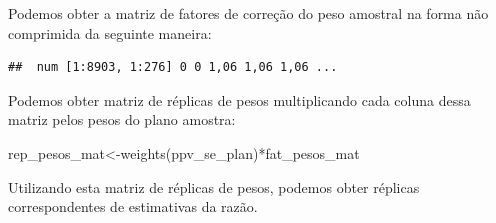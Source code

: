 \documentclass[
  12pt,
  brazilian,
]{book}
\newenvironment{Shaded}{\begin{snugshade}}{\end{snugshade}}
\newcommand{\ControlFlowTok}[1]{\textcolor[rgb]{0.13,0.29,0.53}{\textbf{#1}}}
\newcommand{\DecValTok}[1]{\textcolor[rgb]{0.00,0.00,0.81}{#1}}
\newcommand{\FunctionTok}[1]{\textcolor[rgb]{0.00,0.00,0.00}{#1}}
\newcommand{\NormalTok}[1]{#1}
\newcommand{\OtherTok}[1]{\textcolor[rgb]{0.56,0.35,0.01}{#1}}
\newcommand{\SpecialCharTok}[1]{\textcolor[rgb]{0.00,0.00,0.00}{#1}}
\theoremstyle{definition}
\theoremstyle{definition}
\theoremstyle{definition}
\theoremstyle{definition}
\theoremstyle{remark}
\begin{document}
Podemos obter a matriz de fatores de correção do peso amostral na forma não comprimida da seguinte maneira:

\begin{Shaded}
\end{Shaded}

\begin{verbatim}
##  num [1:8903, 1:276] 0 0 1,06 1,06 1,06 ...
\end{verbatim}

Podemos obter matriz de réplicas de pesos multiplicando cada coluna dessa matriz pelos pesos do plano amostra:

\begin{Shaded}
\begin{Highlighting}[]
\NormalTok{rep\_pesos\_mat}\OtherTok{\textless{}{-}}\FunctionTok{weights}\NormalTok{(ppv\_se\_plan)}\SpecialCharTok{*}\NormalTok{fat\_pesos\_mat}
\end{Highlighting}
\end{Shaded}

Utilizando esta matriz de réplicas de pesos, podemos obter réplicas correspondentes de estimativas da razão.

\begin{Shaded}
\end{Shaded}
\end{document}
